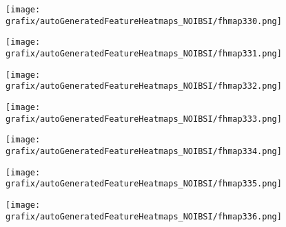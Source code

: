 \begin{subfigure}{\wid\textwidth} 
    \centering 
    \caption{\tiny \sffamily {}} 
    \vspace{\vsp} 
    \texttt{[image: grafix/autoGeneratedFeatureHeatmaps\_NOIBSI/fhmap330.png]} 
\end{subfigure} 
\hspace{\hsp} 
\begin{subfigure}{\wid\textwidth} 
    \centering 
    \caption{\tiny \sffamily {}} 
    \vspace{\vsp} 
    \texttt{[image: grafix/autoGeneratedFeatureHeatmaps\_NOIBSI/fhmap331.png]} 
\end{subfigure} 
\hspace{\hsp} 
\begin{subfigure}{\wid\textwidth} 
    \centering 
    \caption{\tiny \sffamily {}} 
    \vspace{\vsp} 
    \texttt{[image: grafix/autoGeneratedFeatureHeatmaps\_NOIBSI/fhmap332.png]} 
\end{subfigure} 
\hspace{\hsp} 
\begin{subfigure}{\wid\textwidth} 
    \centering 
    \caption{\tiny \sffamily {}} 
    \vspace{\vsp} 
    \texttt{[image: grafix/autoGeneratedFeatureHeatmaps\_NOIBSI/fhmap333.png]} 
\end{subfigure} 
\hspace{\hsp} 
\begin{subfigure}{\wid\textwidth} 
    \centering 
    \caption{\tiny \sffamily {}} 
    \vspace{\vsp} 
    \texttt{[image: grafix/autoGeneratedFeatureHeatmaps\_NOIBSI/fhmap334.png]} 
\end{subfigure} 
\hspace{\hsp} 
\begin{subfigure}{\wid\textwidth} 
    \centering 
    \caption{\tiny \sffamily {}} 
    \vspace{\vsp} 
    \texttt{[image: grafix/autoGeneratedFeatureHeatmaps\_NOIBSI/fhmap335.png]} 
\end{subfigure} 
\hspace{\hsp} 
\begin{subfigure}{\wid\textwidth} 
    \centering 
    \caption{\tiny \sffamily {}} 
    \vspace{\vsp} 
    \texttt{[image: grafix/autoGeneratedFeatureHeatmaps\_NOIBSI/fhmap336.png]} 
\end{subfigure} 
